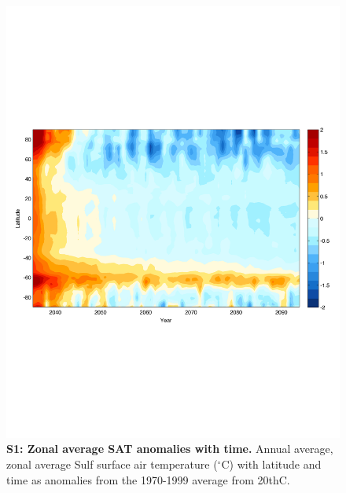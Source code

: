 \documentclass{nature}
\begin{document}
\begin{figure}%
\noindent\includegraphics[width=39pc]{figures/SuppFig2.pdf}  %
\caption{\textbf{S1: Zonal average SAT anomalies with time.} Annual average, zonal average Sulf surface air temperature ($^\circ$C) with latitude and time as anomalies from the 1970-1999 average from 20thC.}
\label{fig:supp1}
\end{figure}
\end{document}
